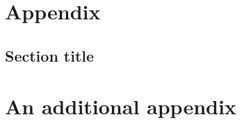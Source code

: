 \appendix
\chapter{Appendix}

\section{Section title}
\cleardoublepage


\chapter{An additional appendix}
\cleardoublepage
